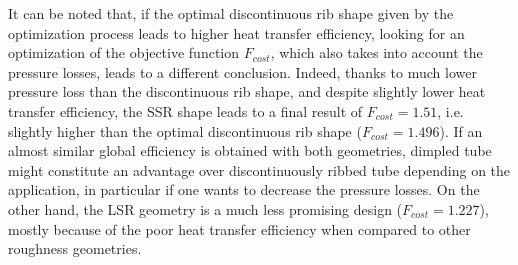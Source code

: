 It can be noted that, if the optimal discontinuous rib shape given by the optimization process leads to higher heat transfer efficiency, looking for an optimization of the objective function $F_{cost}$, which also takes into account the pressure losses, leads to a different conclusion. Indeed, thanks to much lower pressure loss than the discontinuous rib shape, and despite slightly lower heat transfer efficiency, the SSR shape leads to a final result of $F_{cost} = 1.51$, i.e. slightly higher than the optimal discontinuous rib shape ($F_{cost} = 1.496$). If an almost similar global efficiency is obtained with both geometries, dimpled tube might constitute an advantage over discontinuously ribbed tube depending on the application, in particular if one wants to decrease the pressure losses. On the other hand, the LSR geometry is a much less promising design ($F_{cost}=1.227$), mostly because of the poor heat transfer efficiency when compared to other roughness geometries.\\

